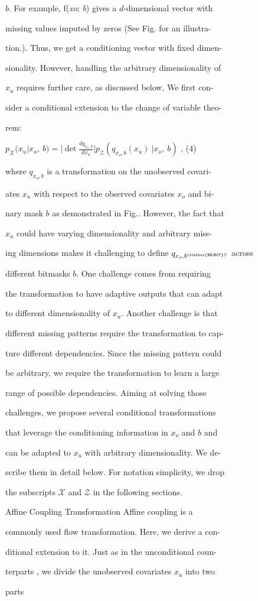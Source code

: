 \documentclass[a4paper,12pt]{article}
\begin{document}
$b$. For example, f({\it xo}; {\it b}) gives a $d$-dimensional vector with

missing values imputed by zeros (See Fig. for an illustra-

tion.). Thus, we get a conditioning vector with fixed dimen-

sionality. However, handling the arbitrary dimensionality of

$x_{u}$ requires further care, as discussed below. We first con-

sider a conditional extension to the change of variable theo-

rem:

$p_{\mathcal{X}}(x_{u}|x_{o},\displaystyle \ b)=|\det\frac{dq_{x_{o},b}}{dx_{u}}|p_{\mathcal{Z}}(q_{x_{o},b}(x_{u})\ |x_{o},\ b)$ , (4)

where $q_{x_{o},b}$ is a transformation on the unobserved covari-

ates $x_{u}$ with respect to the observed covariates $x_{o}$ and bi-

nary mask $b$ as demonstrated in Fig.. However, the fact that

$x_{u}$ could have varying dimensionality and arbitrary miss-

ing dimensions makes it challenging to define $q_{x_{o},b^{\ovalbox{\tt\small REJECT} \mathrm{S}}}$ across

different bitmasks $b$. One challenge comes from requiring

the transformation to have adaptive outputs that can adapt

to different dimensionality of $x_{u}$. Another challenge is that

different missing patterns require the transformation to cap-

ture different dependencies. Since the missing pattern could

be arbitrary, we require the transformation to learn a large

range of possible dependencies. Aiming at solving those

challenges, we propose several conditional transformations

that leverage the conditioning information in $x_{o}$ and $b$ and

can be adapted to $x_{u}$ with arbitrary dimensionality. We de-

scribe them in detail below. For notation simplicity, we drop

the subscripts $\mathcal{X}$ and $\mathcal{Z}$ in the following sections.

Affine Coupling Transformation Affine coupling is a

commonly used flow transformation. Here, we derive a con-

ditional extension to it. Just as in the unconditional coun-

terparts , we divide the unobserved covariates $x_{u}$ into two

parts
\end{document}
